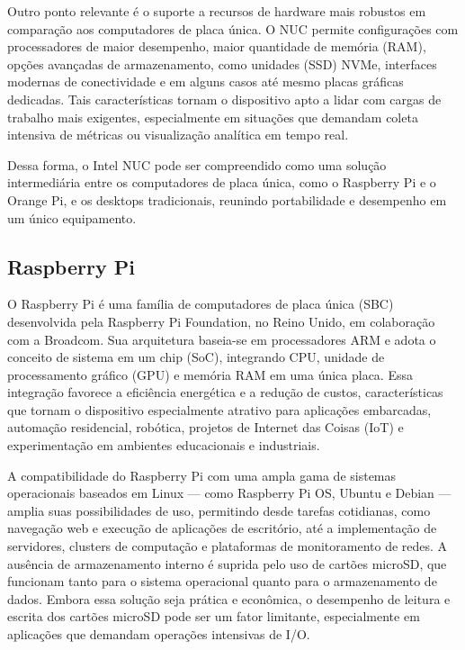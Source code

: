 Outro ponto relevante é o suporte a recursos de hardware mais robustos em comparação aos computadores de placa única. O NUC permite configurações com processadores de maior desempenho, maior quantidade de memória  (RAM), opções avançadas de armazenamento, como unidades  (SSD) NVMe, interfaces modernas de conectividade e em alguns casos até mesmo placas gráficas dedicadas. Tais características tornam o dispositivo apto a lidar com cargas de trabalho mais exigentes, especialmente em situações que demandam coleta intensiva de métricas ou visualização analítica em tempo real.

Dessa forma, o Intel NUC pode ser compreendido como uma solução intermediária entre os computadores de placa única, como o Raspberry Pi e o Orange Pi, e os desktops tradicionais, reunindo portabilidade e desempenho em um único equipamento.

\subsection{Raspberry Pi}
\label{subsection:RaspberryPi}

O Raspberry Pi \citep{raspihw2025} é uma família de computadores de placa única (SBC) desenvolvida pela Raspberry Pi Foundation, no Reino Unido, em colaboração com a Broadcom. Sua arquitetura baseia-se em processadores ARM e adota o conceito de sistema em um chip (SoC), integrando CPU, unidade de processamento gráfico (GPU) e memória RAM em uma única placa. Essa integração favorece a eficiência energética e a redução de custos, características que tornam o dispositivo especialmente atrativo para aplicações embarcadas, automação residencial, robótica, projetos de Internet das Coisas (IoT) e experimentação em ambientes educacionais e industriais.

A compatibilidade do Raspberry Pi com uma ampla gama de sistemas operacionais baseados em Linux --- como Raspberry Pi OS, Ubuntu e Debian --- amplia suas possibilidades de uso, permitindo desde tarefas cotidianas, como navegação web e execução de aplicações de escritório, até a implementação de servidores, clusters de computação e plataformas de monitoramento de redes. A ausência de armazenamento interno é suprida pelo uso de cartões microSD, que funcionam tanto para o sistema operacional quanto para o armazenamento de dados. Embora essa solução seja prática e econômica, o desempenho de leitura e escrita dos cartões microSD pode ser um fator limitante, especialmente em aplicações que demandam operações intensivas de I/O.

